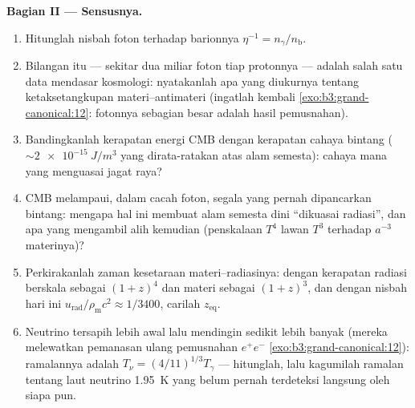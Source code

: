 \begin{problem}
\medskip\noindent\textbf{Bagian II --- Sensusnya.}
\begin{enumerate}[resume]
  \item Hitunglah nisbah foton terhadap barionnya $\eta^{-1} =
        n_\gamma/n_{\text{b}}$.
  \item Bilangan itu --- sekitar dua miliar foton tiap protonnya ---
        adalah salah satu data mendasar kosmologi: nyatakanlah apa yang
        diukurnya tentang ketaksetangkupan materi--antimateri (ingatlah
        kembali \cref{exo:b3:grand-canonical:12}: fotonnya sebagian besar
        adalah hasil pemusnahan).
  \item Bandingkanlah kerapatan energi CMB dengan kerapatan cahaya
        bintang ($\sim\qty{2e-15}{J/m^3}$ yang dirata-ratakan atas alam
        semesta): cahaya mana yang menguasai jagat raya?
  \item CMB melampaui, dalam cacah foton, segala yang pernah dipancarkan
        bintang: mengapa hal ini membuat alam semesta dini ``dikuasai
        radiasi'', dan apa yang mengambil alih kemudian (penskalaan
        $T^4$ lawan $T^3$ terhadap $a^{-3}$ materinya)?
  \item Perkirakanlah zaman kesetaraan materi--radiasinya: dengan
        kerapatan radiasi berskala sebagai $(1+z)^4$ dan materi sebagai
        $(1+z)^3$, dan dengan nisbah hari ini
        $u_{\text{rad}}/\rho_{\text{m}}c^2 \approx 1/3400$, carilah
        $z_{\text{eq}}$.
  \item Neutrino tersapih lebih awal lalu mendingin sedikit lebih banyak
        (mereka melewatkan pemanasan ulang pemusnahan $e^+e^-$
        \cref{exo:b3:grand-canonical:12}): ramalannya adalah
        $T_\nu = (4/11)^{1/3}T_\gamma$ --- hitunglah, lalu
        kagumilah ramalan tentang laut neutrino \qty{1.95}{K}
        yang belum pernah terdeteksi langsung oleh siapa pun.
\end{enumerate}


\end{problem}
